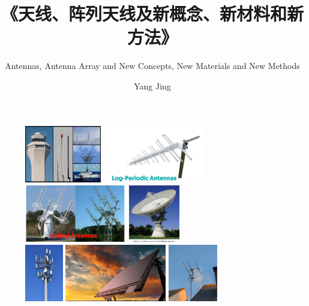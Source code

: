 \documentclass{ctexbeamer}
\title[天线、天线阵列及新概念、新材料和新方法]{《天线、阵列天线及新概念、新材料和新方法》}
\subtitle{Antennas, Antenna Array and New Concepts, New Materials and New Methods}
\author{Yang Jing\inst{}}
\institute[Sch.EIE HFNU]
{
    \inst{} %
    合肥师范学院\\
    电子信息与电气工程学院\\
}
\begin{document}
\frame{\titlepage}

\begin{frame}
    \begin{figure}
        \includegraphics[height=2.5cm]{Native-content-Muldipols-image-Rev-1.png}
        \includegraphics[height=2.5cm]{Log-Periodic-Antennas-768x432.png}\\
        \includegraphics[height=2.5cm]{Helical-Antennas-768x432.png}
        \includegraphics[height=2.5cm]{2-Figure1-1.png}\\
        \includegraphics[height=2.5cm]{Com_1.jpg}
        \includegraphics[height=2.5cm]{61648_O.jpg}
        \includegraphics[height=2.5cm]{tri-band-amsat-antenna-array.jpg}
    \end{figure}
\end{frame}
\end{document}
